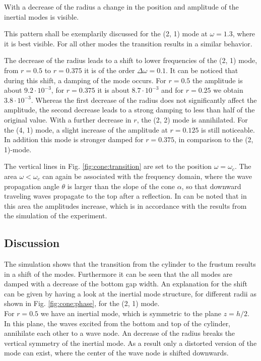With a decrease of the radius a change in the position and amplitude of the
inertial modes is visible.

This pattern shall be exemplarily discussed  for the (2, 1) mode at $\omega=1.3$, where it is best visible.
For all other modes the transition results in a similar behavior.

The decrease of the radius leads to a shift to lower frequencies of the (2, 1) mode,
from $r=0.5$ to $r=0.375$ it is of the order $\Delta \omega=0.1$.
It can be noticed that during this shift, a damping of the mode occurs.
For $r=0.5$ the amplitude is about $9.2\cdot10^{-3}$, for $r=0.375$ it is
about $8.7\cdot10^{-3}$ and for $r=0.25$ we obtain $3.8\cdot10^{-3}$.
Whereas the first decrease of the radius does not significantly affect the amplitude,
the second decrease leads to a strong damping to less than half of the original value.
With a further decrease in $r$, the (2, 2) mode is annihilated.
For the (4, 1) mode, a slight increase of the amplitude at $r=0.125$ is still noticeable.
In addition this mode is stronger damped for $r=0.375$, in comparison to the (2, 1)-mode.

The vertical lines in Fig. \ref{fig:cone:transition} are set to the position $\omega=\omega_c$.
The area $\omega<\omega_c$ can again be associated with the frequency domain, where the wave propagation angle $\theta$ is larger than
the  slope of the cone $\alpha$, so that downward traveling waves propagate to the top after a reflection.
In can be noted that in this area the amplitudes increase, which is in accordance with the
results from the simulation of the experiment.

\subsection{Discussion}%
\label{cone:discussion_transition}

The simulation shows that the transition from the cylinder
to the frustum results in a shift of the modes.
Furthermore it can be seen that the all modes are damped with a decrease of the bottom gap width.
An explanation for the shift can be given by having a look at the inertial mode structure,
for different radii as shown in Fig. \ref{fig:cone:phase}, for the (2, 1) mode.\\
For $r=0.5$ we have an inertial mode, which is symmetric to the plane $z=h/2$.
In this plane, the waves excited from the bottom and top of the cylinder, annihilate each other to a wave node.
An decrease of the radius breaks the vertical symmetry of the inertial mode.
As a result only a distorted version of the mode can exist, where the center of the wave node
is shifted downwards.


